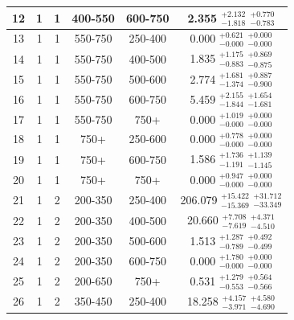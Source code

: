 \begin{table}[htbp]
\begin{centering}
\begin{tabular}{|c|c|c|c|c||c|}
\hline
12 &               1 &               1 &         400-550 &         600-750 & 2.355 $^{+2.132}_{-1.818}$ $^{+0.770}_{-0.783}$ \\ 
\hline
13 &               1 &               1 &         550-750 &         250-400 & 0.000 $^{+0.621}_{-0.000}$ $^{+0.000}_{-0.000}$ \\ 
\hline
14 &               1 &               1 &         550-750 &         400-500 & 1.835 $^{+1.175}_{-0.883}$ $^{+0.869}_{-0.875}$ \\ 
\hline
15 &               1 &               1 &         550-750 &         500-600 & 2.774 $^{+1.681}_{-1.374}$ $^{+0.887}_{-0.900}$ \\ 
\hline
16 &               1 &               1 &         550-750 &         600-750 & 5.459 $^{+2.155}_{-1.844}$ $^{+1.654}_{-1.681}$ \\ 
\hline
17 &               1 &               1 &         550-750 &            750+ & 0.000 $^{+1.019}_{-0.000}$ $^{+0.000}_{-0.000}$ \\ 
\hline
18 &               1 &               1 &            750+ &         250-600 & 0.000 $^{+0.778}_{-0.000}$ $^{+0.000}_{-0.000}$ \\ 
\hline
19 &               1 &               1 &            750+ &         600-750 & 1.586 $^{+1.736}_{-1.191}$ $^{+1.139}_{-1.145}$ \\ 
\hline
20 &               1 &               1 &            750+ &            750+ & 0.000 $^{+0.947}_{-0.000}$ $^{+0.000}_{-0.000}$ \\ 
\hline
21 &               1 &               2 &         200-350 &         250-400 & 206.079 $^{+15.422}_{-15.369}$ $^{+31.712}_{-33.349}$ \\ 
\hline
22 &               1 &               2 &         200-350 &         400-500 & 20.660 $^{+7.708}_{-7.619}$ $^{+4.371}_{-4.510}$ \\ 
\hline
23 &               1 &               2 &         200-350 &         500-600 & 1.513 $^{+1.287}_{-0.789}$ $^{+0.492}_{-0.499}$ \\ 
\hline
24 &               1 &               2 &         200-350 &         600-750 & 0.000 $^{+1.780}_{-0.000}$ $^{+0.000}_{-0.000}$ \\ 
\hline
25 &               1 &               2 &         200-650 &            750+ & 0.531 $^{+1.279}_{-0.553}$ $^{+0.564}_{-0.566}$ \\ 
\hline
26 &               1 &               2 &         350-450 &         250-400 & 18.258 $^{+4.157}_{-3.971}$ $^{+4.580}_{-4.690}$ \\ 

\end{tabular}
\end{centering}
\end{table}
